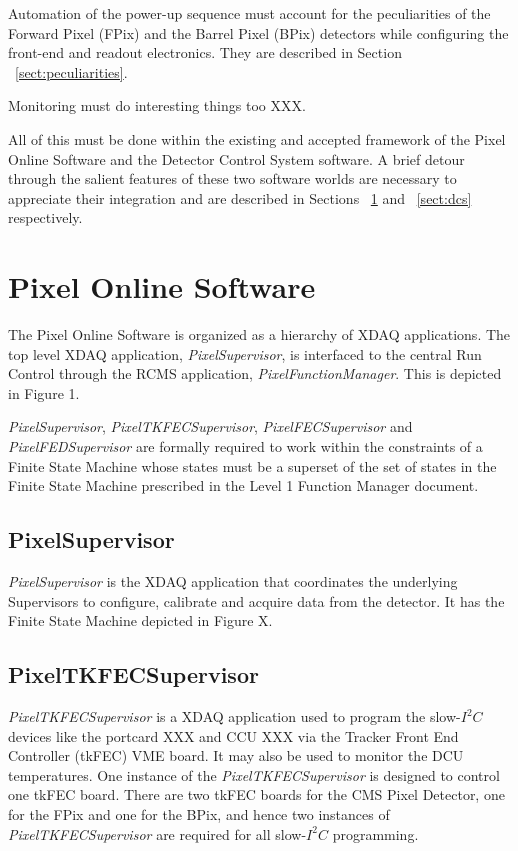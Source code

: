 \documentclass{cmspaper}
\begin{document}
Automation of the power-up sequence must account for the peculiarities of the Forward Pixel (FPix) and the Barrel Pixel (BPix) detectors while configuring the front-end and readout electronics. They are described in Section ~\ref{sect:peculiarities}.

Monitoring must do interesting things too XXX.

All of this must be done within the existing and accepted framework of the Pixel Online Software and the Detector Control System software. A brief detour through the salient features of these two software worlds are necessary to appreciate their integration and are described in Sections ~\ref{sect:pos} and ~\ref{sect:dcs} respectively.


\section{Pixel Online Software} \label{sect:pos}

The Pixel Online Software is organized as a hierarchy of XDAQ applications. The top level XDAQ application, \textit{PixelSupervisor}, is interfaced to the central Run Control through the RCMS application, \textit{PixelFunctionManager}. This is depicted in Figure {1}.

\textit{PixelSupervisor}, \textit{PixelTKFECSupervisor}, \textit{PixelFECSupervisor} and \textit{PixelFEDSupervisor} are formally required to work within the constraints of a Finite State Machine whose states must be a superset of the set of states in the Finite State Machine prescribed in the Level 1 Function Manager document.

\subsection{PixelSupervisor}

\textit{PixelSupervisor} is the XDAQ application that coordinates the underlying Supervisors to configure, calibrate and acquire data from the detector. It has the Finite State Machine depicted in Figure {X}.

\subsection{PixelTKFECSupervisor}

\textit{PixelTKFECSupervisor} is a XDAQ application used to program the slow-$I^{2}C$ devices like the portcard XXX and CCU XXX via the Tracker Front End Controller (tkFEC) VME board. It may also be used to monitor the DCU temperatures. One instance of the \textit{PixelTKFECSupervisor} is designed to control one tkFEC board. There are two tkFEC boards for the CMS Pixel Detector, one for the FPix and one for the BPix, and hence two instances of \textit{PixelTKFECSupervisor} are required for all slow-$I^{2}C$ programming.
\end{document}
